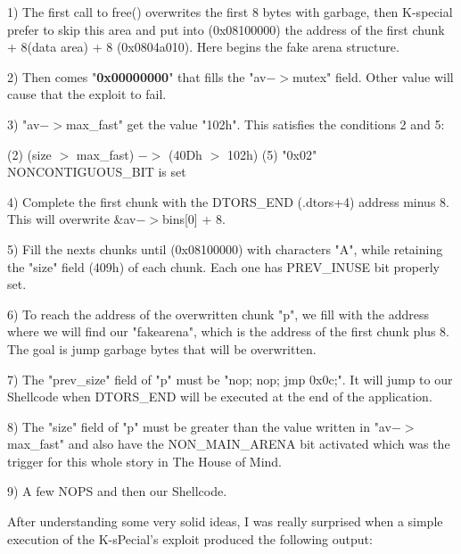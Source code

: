 \documentclass[12pt]{article}
\begin{document}
1)  The first call to free() overwrites the first 8 bytes with garbage,
    then K-special prefer to skip this area and put into (0x08100000)
    the address of the first chunk + 8(data area) + 8 (0x0804a010).
    Here begins the fake arena structure.
\newline


2)  Then comes "\textbf{0x00000000}" that fills the "av$->$mutex" field.
    Other value will cause that the exploit to fail.
\newline


3)  "av$->$max\_fast" get the value "102h". This satisfies the conditions
    2 and 5:
\newline


    (2) (size $>$ max\_fast) $->$ (40Dh $>$ 102h)\newline
    (5) "0x02" NONCONTIGUOUS\_BIT is set
\newline


4)  Complete the first chunk with the DTORS\_END (.dtors+4) address
    minus 8. This will overwrite \&av$->$bins[0] + 8.
\newline


5)  Fill the nexts chunks until (0x08100000) with characters "A", while
    retaining the "size" field (409h) of each chunk. Each one has
    PREV\_INUSE bit properly set.
\newline


6)  To reach the address of the overwritten chunk "p", we fill with
    the address where we will find our "fakearena", which is the
    address of the first chunk plus 8. The goal is jump garbage bytes
    that will be overwritten. 
\newline


7)  The "prev\_size" field of "p" must be "nop; nop; jmp 0x0c;". It will
    jump to our Shellcode when DTORS\_END will be executed at the end of
    the application.
\newline


8)  The "size" field of "p" must be greater than the value written in
    "av$->$max\_fast" and also have the NON\_MAIN\_ARENA bit activated
    which was the trigger for this whole story in The House of Mind.
\newline


9)  A few NOPS and then our Shellcode.
\newline


After understanding some very solid ideas, I was really surprised when a
simple execution of the K-sPecial's exploit produced the following output:
\newline
\end{document}
